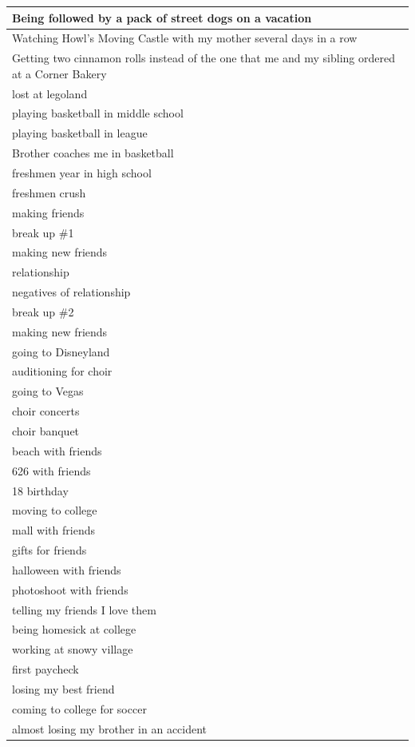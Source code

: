 \documentclass[
  .7em,
  letterpaper,
  DIV=11,
  numbers=noendperiod]{scrartcl}
\begin{document}
\begin{table}
\begin{tabular}{l}
\hline
Being followed by a pack of street dogs on a vacation\\
\hline
Watching Howl's Moving Castle with my mother several days in a row\\
\hline
Getting two cinnamon rolls instead of the one that me and my sibling ordered at a Corner Bakery\\
\hline
lost at legoland\\
\hline
playing basketball in middle school\\
\hline
playing basketball in league\\
\hline
Brother coaches me in basketball\\
\hline
freshmen year in high school\\
\hline
freshmen crush\\
\hline
making friends\\
\hline
break up \#1\\
\hline
making new friends\\
\hline
relationship\\
\hline
negatives of relationship\\
\hline
break up \#2\\
\hline
making new friends\\
\hline
going to Disneyland\\
\hline
auditioning for choir\\
\hline
going to Vegas\\
\hline
choir concerts\\
\hline
choir banquet\\
\hline
beach with friends\\
\hline
626 with friends\\
\hline
18 birthday\\
\hline
moving to college\\
\hline
mall with friends\\
\hline
gifts for friends\\
\hline
halloween with friends\\
\hline
photoshoot with friends\\
\hline
telling my friends I love them\\
\hline
being homesick at college\\
\hline
working at snowy village\\
\hline
first paycheck\\
\hline
losing my best friend\\
\hline
coming to college for soccer\\
\hline
almost losing my brother in an accident\\

\end{tabular}
\end{table}
\end{document}
